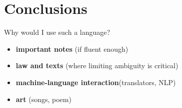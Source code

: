 \section{Conclusions}
\begin{frame}{Why would I use such a language?}
    \begin{itemize}
        \item \textbf{important notes} (if fluent enough)
        \item<2-> \textbf{law and texts} (where limiting ambiguity is critical)
        \item<3-> \textbf{machine-language interaction}(translators, NLP)
        \item<4-> \textbf{art} (songs, poem)
    \end{itemize}
\end{frame}

